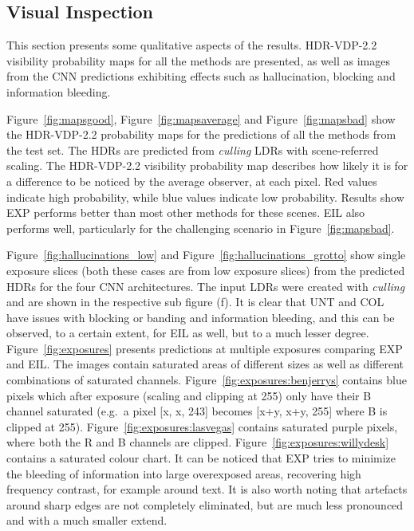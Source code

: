 \documentclass{egpubl}
\newcommand{\tc}[1]{{#1}}
\begin{document}
\subsection{\textbf{Visual Inspection}}\label{sec:comparemodels}

This section presents some qualitative aspects of the results. HDR-VDP-2.2
visibility probability maps for all the methods are presented, as well as
images from the CNN predictions exhibiting effects such as hallucination,
blocking and information bleeding.

Figure~\ref{fig:mapsgood}, Figure~\ref{fig:mapsaverage} and
Figure~\ref{fig:mapsbad} show the HDR-VDP-2.2 probability maps for the
predictions of all the methods from the test set. The HDRs are predicted from
\textit{culling} LDRs with scene-referred scaling. The HDR-VDP-2.2 visibility
probability map describes how likely it is for a difference to be noticed by
the average observer, at each pixel. Red values indicate high probability,
while blue values indicate low probability. Results show EXP performs better
than most other methods for these scenes. EIL also performs well, particularly
for the challenging scenario in Figure~\ref{fig:mapsbad}.

Figure~\ref{fig:hallucinations_low} and Figure~\ref{fig:hallucinations_grotto}
show single exposure slices (both these cases are from low exposure slices) from the predicted HDRs for the four CNN
architectures. The input LDRs were created with \textit{culling} and are shown in the respective sub figure (f). It is clear
that UNT and COL have issues with blocking or banding and information bleeding, and this
can be observed, to a certain extent, for EIL as well, but to a much lesser degree.
\tc{Figure~\ref{fig:exposures} presents predictions at multiple exposures
comparing EXP and EIL. The images contain saturated areas of different
sizes as well as different combinations of saturated channels.
Figure~\ref{fig:exposures:benjerrys} contains blue pixels which after exposure
(scaling and clipping at 255) only have their B channel saturated (e.g.\ a pixel
[x, x, 243] becomes [x+y, x+y, 255] where B is clipped at 255).
Figure~\ref{fig:exposures:lasvegas} contains saturated purple pixels, where
both the R and B channels are clipped. Figure~\ref{fig:exposures:willydesk}
contains a saturated colour chart. It can be noticed that EXP tries to
minimize the bleeding of information into large overexposed areas, recovering
high frequency contrast, for example around text. It is also worth noting that
artefacts around sharp edges are not completely eliminated, but are much less
pronounced and with a much smaller extend.}
\end{document}
